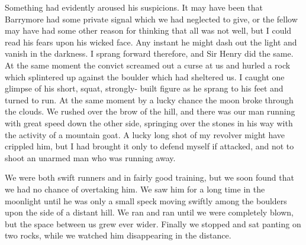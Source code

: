 \documentclass[paper=a5,BCOR=7mm,twoside,DIV=calc,12pt,usegeometry,openany,chapterprefix,endperiod,headings=big]{scrbook} %
\begin{document}
Something had evidently aroused his suspicions. It may have been that Barrymore had some private signal which we had neglected to give, or the fellow may have had some other reason for thinking that all was not well, but I could read his fears upon his wicked face. Any instant he might dash out the light and vanish in the darkness. I sprang forward therefore, and Sir Henry did the same. At the same moment the convict screamed out a curse at us and hurled a rock which splintered up against the boulder which had sheltered us. I caught one glimpse of his short, squat, strongly- built figure as he sprang to his feet and turned to run. At the same moment by a lucky chance the moon broke through the clouds. We rushed over the brow of the hill, and there was our man running with great speed down the other side, springing over the stones in his way with the activity of a mountain goat. A lucky long shot of my revolver might have crippled him, but I had brought it only to defend myself if attacked, and not to shoot an unarmed man who was running away.

We were both swift runners and in fairly good training, but we soon found that we had no chance of overtaking him. We saw him for a long time in the moonlight until he was only a small speck moving swiftly among the boulders upon the side of a distant hill. We ran and ran until we were completely blown, but the space between us grew ever wider. Finally we stopped and sat panting on two rocks, while we watched him disappearing in the distance.
\end{document}
